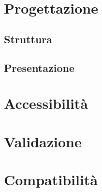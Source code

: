 \newpage
\section{Progettazione}
	\subsection{Struttura}
		
	\subsection{Presentazione}
		
\newpage
\section{Accessibilit\`a}
		

\newpage
\section{Validazione}
		

\newpage
\section{Compatibilit\`a}
	

